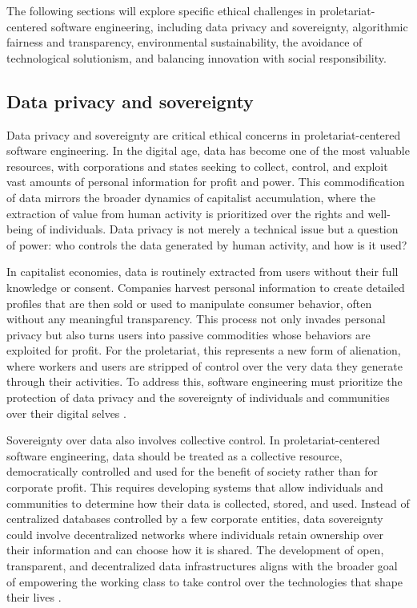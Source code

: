 \begin{refsection}
The following sections will explore specific ethical challenges in proletariat-centered software engineering, including data privacy and sovereignty, algorithmic fairness and transparency, environmental sustainability, the avoidance of technological solutionism, and balancing innovation with social responsibility.

\subsection{Data privacy and sovereignty}

Data privacy and sovereignty are critical ethical concerns in proletariat-centered software engineering. In the digital age, data has become one of the most valuable resources, with corporations and states seeking to collect, control, and exploit vast amounts of personal information for profit and power. This commodification of data mirrors the broader dynamics of capitalist accumulation, where the extraction of value from human activity is prioritized over the rights and well-being of individuals. Data privacy is not merely a technical issue but a question of power: who controls the data generated by human activity, and how is it used?

In capitalist economies, data is routinely extracted from users without their full knowledge or consent. Companies harvest personal information to create detailed profiles that are then sold or used to manipulate consumer behavior, often without any meaningful transparency. This process not only invades personal privacy but also turns users into passive commodities whose behaviors are exploited for profit. For the proletariat, this represents a new form of alienation, where workers and users are stripped of control over the very data they generate through their activities. To address this, software engineering must prioritize the protection of data privacy and the sovereignty of individuals and communities over their digital selves \cite[pp.~150-152]{fuchs2014}.

Sovereignty over data also involves collective control. In proletariat-centered software engineering, data should be treated as a collective resource, democratically controlled and used for the benefit of society rather than for corporate profit. This requires developing systems that allow individuals and communities to determine how their data is collected, stored, and used. Instead of centralized databases controlled by a few corporate entities, data sovereignty could involve decentralized networks where individuals retain ownership over their information and can choose how it is shared. The development of open, transparent, and decentralized data infrastructures aligns with the broader goal of empowering the working class to take control over the technologies that shape their lives \cite[pp.~36-38]{morozov2015}.


\end{refsection}
